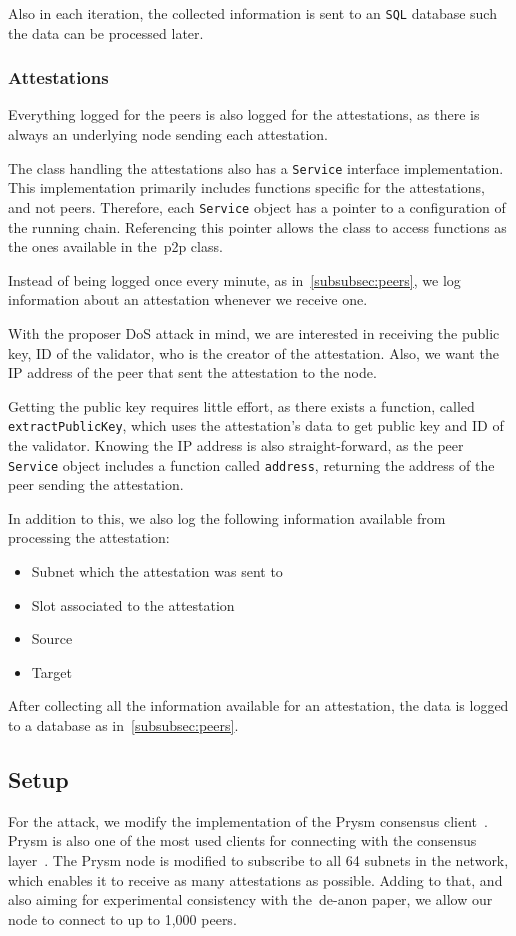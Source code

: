Also in each iteration,
the collected information is sent to an \texttt{SQL} database such the data can be processed later.

\subsubsection{Attestations}\label{subsubsec:attestations}
Everything logged for the peers is also logged for the attestations,
as there is always an underlying node sending each attestation.

The class handling the attestations also has a \texttt{Service} interface implementation.
This implementation primarily includes functions specific for the attestations, and not peers.
Therefore, each \texttt{Service} object has a pointer to a configuration of the running chain.
Referencing this pointer allows the class to access functions as the ones available in the~\gls{p2p} class.

Instead of being logged once every minute, as in~\autoref{subsubsec:peers},
we log information about an attestation whenever we receive one.

With the proposer DoS attack in mind, we are interested in receiving the public key, ID of the validator,
who is the creator of the attestation.
Also, we want the IP address of the peer that sent the attestation to the node.

Getting the public key requires little effort,
as there exists a function, called \texttt{extractPublicKey}, which uses the attestation's data to get public key and ID of the validator.
Knowing the IP address is also straight-forward, as the peer \texttt{Service} object includes a function called \texttt{address}, returning the address of the peer sending the attestation.

In addition to this, we also log the following information available from processing the attestation:
\begin{itemize}
     \item Subnet which the attestation was sent to
     \item Slot associated to the attestation
     \item Source
     \item Target
\end{itemize}

After collecting all the information available for an attestation,
the data is logged to a database as in~\autoref{subsubsec:peers}.

\subsection{Setup}\label{subsec:setup}
For the attack, we modify the implementation of the Prysm consensus client~\cite{prysm}.
Prysm is also one of the most used clients for connecting with the consensus layer~\cite{client-diversity}.
The Prysm node is modified to subscribe to all 64 subnets in the network, which enables it to receive as many attestations as possible.
Adding to that, and also aiming for experimental consistency with the~\gls{de-anon paper}, we allow our node to connect to up to 1,000 peers.

